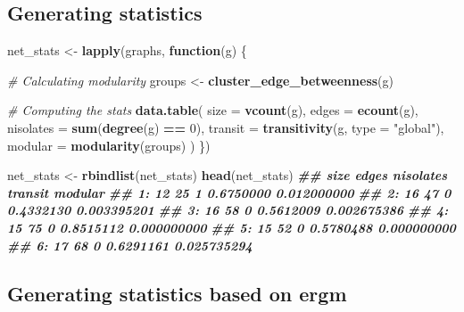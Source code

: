 \documentclass[
]{book}
\newenvironment{Shaded}{\begin{snugshade}}{\end{snugshade}}
\newcommand{\AttributeTok}[1]{\textcolor[rgb]{0.13,0.29,0.53}{#1}}
\newcommand{\CommentTok}[1]{\textcolor[rgb]{0.56,0.35,0.01}{\textit{#1}}}
\newcommand{\ControlFlowTok}[1]{\textcolor[rgb]{0.13,0.29,0.53}{\textbf{#1}}}
\newcommand{\DecValTok}[1]{\textcolor[rgb]{0.00,0.00,0.81}{#1}}
\newcommand{\DocumentationTok}[1]{\textcolor[rgb]{0.56,0.35,0.01}{\textbf{\textit{#1}}}}
\newcommand{\FunctionTok}[1]{\textcolor[rgb]{0.13,0.29,0.53}{\textbf{#1}}}
\newcommand{\NormalTok}[1]{#1}
\newcommand{\OtherTok}[1]{\textcolor[rgb]{0.56,0.35,0.01}{#1}}
\newcommand{\SpecialCharTok}[1]{\textcolor[rgb]{0.81,0.36,0.00}{\textbf{#1}}}
\newcommand{\StringTok}[1]{\textcolor[rgb]{0.31,0.60,0.02}{#1}}
\begin{document}
\hypertarget{generating-statistics}{%
\subsection{Generating statistics}\label{generating-statistics}}

\begin{Shaded}
\begin{Highlighting}[]
\NormalTok{net\_stats }\OtherTok{\textless{}{-}} \FunctionTok{lapply}\NormalTok{(graphs, }\ControlFlowTok{function}\NormalTok{(g) \{}
  
  \CommentTok{\# Calculating modularity}
\NormalTok{  groups }\OtherTok{\textless{}{-}} \FunctionTok{cluster\_edge\_betweenness}\NormalTok{(g)}
  
  \CommentTok{\# Computing the stats}
  \FunctionTok{data.table}\NormalTok{(}
    \AttributeTok{size      =} \FunctionTok{vcount}\NormalTok{(g),}
    \AttributeTok{edges     =} \FunctionTok{ecount}\NormalTok{(g),}
    \AttributeTok{nisolates =} \FunctionTok{sum}\NormalTok{(}\FunctionTok{degree}\NormalTok{(g) }\SpecialCharTok{==} \DecValTok{0}\NormalTok{),}
    \AttributeTok{transit   =} \FunctionTok{transitivity}\NormalTok{(g, }\AttributeTok{type =} \StringTok{"global"}\NormalTok{),}
    \AttributeTok{modular   =} \FunctionTok{modularity}\NormalTok{(groups)}
\NormalTok{  )}
\NormalTok{\})}

\NormalTok{net\_stats }\OtherTok{\textless{}{-}} \FunctionTok{rbindlist}\NormalTok{(net\_stats)}
\FunctionTok{head}\NormalTok{(net\_stats)}
\DocumentationTok{\#\#    size edges nisolates   transit     modular}
\DocumentationTok{\#\# 1:   12    25         1 0.6750000 0.012000000}
\DocumentationTok{\#\# 2:   16    47         0 0.4332130 0.003395201}
\DocumentationTok{\#\# 3:   16    58         0 0.5612009 0.002675386}
\DocumentationTok{\#\# 4:   15    75         0 0.8515112 0.000000000}
\DocumentationTok{\#\# 5:   15    52         0 0.5780488 0.000000000}
\DocumentationTok{\#\# 6:   17    68         0 0.6291161 0.025735294}
\end{Highlighting}
\end{Shaded}

\hypertarget{generating-statistics-based-on-ergm}{%
\subsection{Generating statistics based on ergm}\label{generating-statistics-based-on-ergm}}
\end{document}
